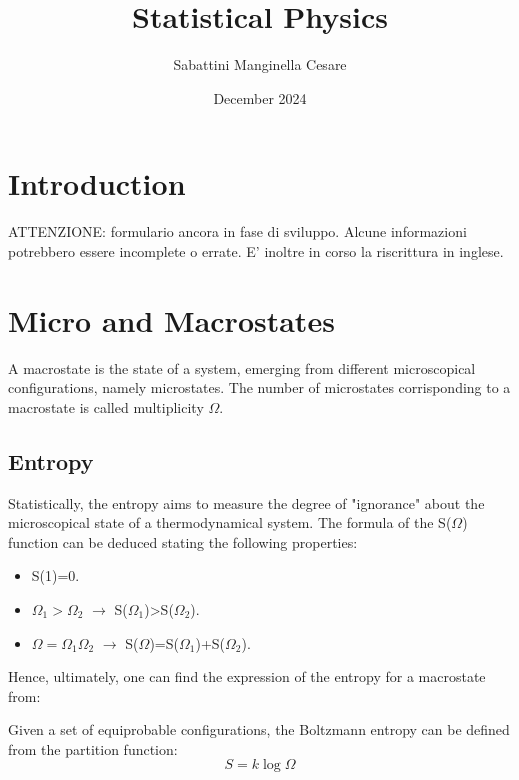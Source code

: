 \documentclass{article}
\title{Statistical Physics}
\author{Sabattini Manginella Cesare}
\date{December 2024}
\begin{document}
\maketitle

\tableofcontents

\newpage

\section{Introduction}
ATTENZIONE: formulario ancora in fase di sviluppo. Alcune informazioni potrebbero essere incomplete o errate.
E' inoltre in corso la riscrittura in inglese.

\newpage

\section{Micro and Macrostates}
A macrostate is the state of a system, emerging from different microscopical configurations, namely microstates.
The number of microstates corrisponding to a macrostate is called multiplicity $\Omega$.

\subsection{Entropy}
Statistically, the entropy aims to measure the degree of "ignorance" about the microscopical state of a thermodynamical system.
The formula of the S($\Omega$) function can be deduced stating the following properties:

\begin{itemize}
    \item S(1)=0.
    \item $\Omega_1>\Omega_2$ $\rightarrow$ S($\Omega_1$)>S($\Omega_2$).
    \item $\Omega=\Omega_1\Omega_2$ $\rightarrow$ S($\Omega$)=S($\Omega_1$)+S($\Omega_2$).
\end{itemize}

Hence, ultimately, one can find the expression of the entropy for a macrostate from:

\begin{tcolorbox}[colframe=gray!50, colback=gray!10, coltitle=black, title=Boltzmann Entropy]
    Given a set of equiprobable configurations, the Boltzmann entropy can be defined from the partition function:
    \begin{equation}
        S = k \log \Omega
    \end{equation}
\end{tcolorbox}
\end{document}
